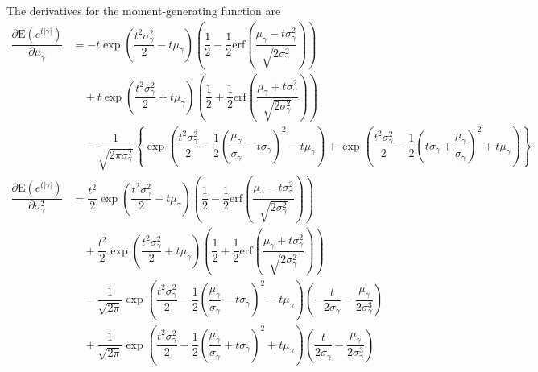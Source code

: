 \documentclass[12pt]{article}
\begin{document}
  The derivatives for the moment-generating function are
  \begin{align}
    \dfrac{\partial \mathrm{E}\left(e^{t\left|\gamma\right|}\right)}{\partial \mu_{\gamma}} &= -t\exp\left(\dfrac{t^{2}\sigma_{\gamma}^{2}}{2}-t\mu_{\gamma}\right)\left(\dfrac{1}{2}-\dfrac{1}{2}\mathrm{erf}\left(\dfrac{\mu_{\gamma}-t\sigma_{\gamma}^{2}}{\sqrt{2\sigma_{\gamma}^{2}}}\right)\right)\\
    &\quad +t\exp\left(\dfrac{t^{2}\sigma_{\gamma}^{2}}{2}+t\mu_{\gamma}\right)\left(\dfrac{1}{2}+\dfrac{1}{2}\mathrm{erf}\left(\dfrac{\mu_{\gamma}+t\sigma_{\gamma}^{2}}{\sqrt{2\sigma_{\gamma}^{2}}}\right)\right)\\
    &\quad -\dfrac{1}{\sqrt{2\pi\sigma_{\gamma}^{2}}}\left\{\exp\left(\dfrac{t^{2}\sigma_{\gamma}^{2}}{2}-\dfrac{1}{2}\left(\dfrac{\mu_{\gamma}}{\sigma_{\gamma}}-t\sigma_{\gamma}\right)^{2}-t\mu_{\gamma}\right)+\exp\left(\dfrac{t^{2}\sigma_{\gamma}^{2}}{2}-\dfrac{1}{2}\left(t\sigma_{\gamma}+\dfrac{\mu_{\gamma}}{\sigma_{\gamma}}\right)^{2}+t\mu_{\gamma}\right) \right\}\\
    \dfrac{\partial \mathrm{E}\left(e^{t\left|\gamma\right|}\right)}{\partial \sigma^{2}_{\gamma}} &= \dfrac{t^{2}}{2}\exp\left(\dfrac{t^{2}\sigma_{\gamma}^{2}}{2}-t\mu_{\gamma}\right)\left(\dfrac{1}{2}-\dfrac{1}{2}\mathrm{erf}\left(\dfrac{\mu_{\gamma}-t\sigma_{\gamma}^{2}}{\sqrt{2\sigma_{\gamma}^{2}}}\right)\right)\\
    &\quad +\dfrac{t^{2}}{2}\exp\left(\dfrac{t^{2}\sigma_{\gamma}^{2}}{2}+t\mu_{\gamma}\right)\left(\dfrac{1}{2}+\dfrac{1}{2}\mathrm{erf}\left(\dfrac{\mu_{\gamma}+t\sigma_{\gamma}^{2}}{\sqrt{2\sigma_{\gamma}^{2}}}\right)\right)\\
    &\quad -\dfrac{1}{\sqrt{2\pi}}\exp\left(\dfrac{t^{2}\sigma_{\gamma}^{2}}{2}-\dfrac{1}{2}\left(\dfrac{\mu_{\gamma}}{\sigma_{\gamma}}-t\sigma_{\gamma}\right)^{2}-t\mu_{\gamma}\right)\left(-\dfrac{t}{2\sigma_{\gamma}}-\dfrac{\mu_{\gamma}}{2\sigma_{\gamma}^{3}}\right)\\
    &\quad +\dfrac{1}{\sqrt{2\pi}}\exp\left(\dfrac{t^{2}\sigma_{\gamma}^{2}}{2}-\dfrac{1}{2}\left(\dfrac{\mu_{\gamma}}{\sigma_{\gamma}}+t\sigma_{\gamma}\right)^{2}+t\mu_{\gamma}\right)\left(\dfrac{t}{2\sigma_{\gamma}}-\dfrac{\mu_{\gamma}}{2\sigma_{\gamma}^{3}}\right)
  \end{align}
\end{document}
